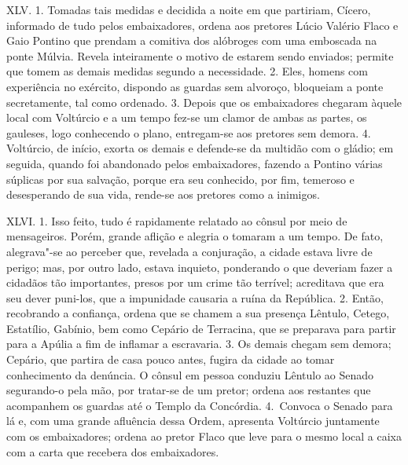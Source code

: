 XLV. 1. Tomadas tais medidas e decidida a noite em que partiriam, Cícero,
informado de tudo pelos embaixadores, ordena aos pretores Lúcio Valério Flaco e
Gaio Pontino que prendam a comitiva dos alóbroges com uma emboscada na ponte
Múlvia. Revela inteiramente o motivo de estarem sendo enviados; permite que
tomem as demais medidas segundo a necessidade. 2. Eles, homens com experiência
no exército, dispondo as guardas sem alvoroço, bloqueiam a ponte secretamente,
tal como ordenado. 3. Depois que os embaixadores chegaram àquele local com
Voltúrcio e a um tempo fez-se um clamor de ambas as partes, os gauleses, logo
conhecendo o plano, entregam-se aos pretores sem demora. 4. Voltúrcio, de
início, exorta os demais e defende-se da multidão com o gládio; em seguida,
quando foi abandonado pelos embaixadores, fazendo a Pontino várias súplicas por
sua salvação, porque era seu conhecido, por fim, temeroso e desesperando de sua
vida, rende-se aos pretores como a inimigos.

XLVI. 1. Isso feito, tudo é rapidamente relatado ao cônsul por meio de
mensageiros. Porém, grande aflição e alegria o tomaram a um tempo. De fato,
alegrava"-se ao perceber que, revelada a conjuração, a cidade estava livre de
perigo; mas, por outro lado, estava inquieto, ponderando o que deveriam fazer a
cidadãos tão importantes, presos por um crime tão terrível; acreditava que era
seu dever puni-los, que a impunidade causaria a ruína da República. 2. Então,
recobrando a confiança, ordena que se chamem a sua presença Lêntulo,
Cetego, Estatílio, Gabínio, bem como Cepário de Terracina, que se preparava
para partir para a Apúlia a fim de inflamar a escravaria. 3. Os demais chegam
sem demora; Cepário, que partira de casa pouco antes, fugira da cidade ao tomar
conhecimento da denúncia. O cônsul em pessoa conduziu Lêntulo ao Senado
segurando-o pela mão, por tratar-se de um pretor; ordena aos restantes que
acompanhem os guardas até o Templo da Concórdia. 4.~Convoca o Senado para lá e,
com uma grande afluência dessa Ordem, apresenta Voltúrcio juntamente com os
embaixadores; ordena ao pretor Flaco que leve para o mesmo local a caixa com a
carta que recebera dos embaixadores.

